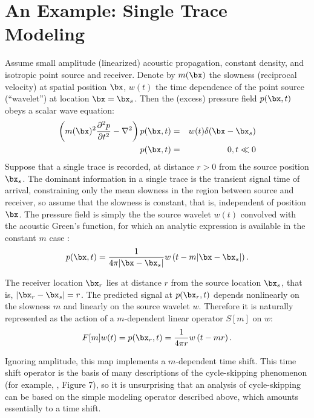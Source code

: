 \section{An Example: Single Trace Modeling}
Assume small amplitude (linearized) acoustic propagation, constant
density, and isotropic point source and receiver. Denote by $m(\bx)$
the slowness (reciprocal velocity) at spatial position $\bx$, $w(t)$
the time dependence of the point source (``wavelet'') at location
$\bx=\bx_s$. Then the (excess) pressure field $p(\bx,t)$ obeys a
scalar wave equation:
\begin{eqnarray}
  \label{eqn:awe}
  \left(m(\bx)^2\frac{\partial^2 p}{\partial t^2} - \nabla^2\right) p(\bx,t) &=&
                                                                         w(t)\delta(\bx-\bx_s) \nonumber\\
  p(\bx,t)&=&0, t\ll 0
\end{eqnarray}
Suppose that a single trace is recorded, at distance $r>0$ from the
source position $\bx_s$. The dominant information in a single
trace is the transient signal time of arrival, constraining only the mean slowness in the
region
between source and receiver, so assume that the
slowness is constant, that is, independent of position $\bx$. The pressure field is simply the  the source
wavelet $w(t)$ convolved with the
acoustic Green's function, for which an analytic expression is
available in the constant $m$ case \cite[]{CourHil:62}:
\begin{equation}
  \label{eqn:homsol}
  p(\bx,t) = \frac{1}{4\pi |\bx-\bx_s|}w\left(t-m|\bx-\bx_s|\right).
\end{equation}

The receiver location $\bx_r$ lies at distance $r$ from the source
location $\bx_s$, that is, $|\bx_r-\bx_s|=r$. The predicted signal at
$p(\bx_r,t)$ depends nonlinearly on the slowness $m$ and linearly on the
source wavelet $w$. Therefore it is naturally represented as the
action of a $m$-dependent linear operator $S[m]$ on $w$:
\begin{equation}
\label{eqn:mod}
F[m]w(t)= p(\bx_r,t) = \frac{1}{4\pi r}w\left(t-mr\right).
\end{equation}

Ignoring amplitude, this map implements a $m$-dependent time
shift. This time shift operator is the basis of many descriptions of
the cycle-skipping phenomenon (for example, \cite{VirieuxOperto:09},
Figure 7), so it is unsurprising that an analysis of cycle-skipping
can be based on the simple modeling operator described above, which
amounts essentially to a time shift.

